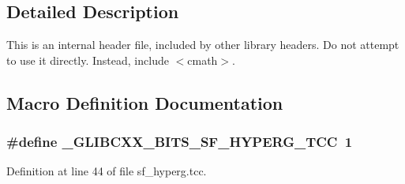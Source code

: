 \subsection{Detailed Description}
This is an internal header file, included by other library headers. Do not attempt to use it directly. Instead, include $<$cmath$>$. 

\subsection{Macro Definition Documentation}
\subsubsection[{\texorpdfstring{\+\_\+\+G\+L\+I\+B\+C\+X\+X\+\_\+\+B\+I\+T\+S\+\_\+\+S\+F\+\_\+\+H\+Y\+P\+E\+R\+G\+\_\+\+T\+CC}{_GLIBCXX_BITS_SF_HYPERG_TCC}}]{\setlength{\rightskip}{0pt plus 5cm}\#define \+\_\+\+G\+L\+I\+B\+C\+X\+X\+\_\+\+B\+I\+T\+S\+\_\+\+S\+F\+\_\+\+H\+Y\+P\+E\+R\+G\+\_\+\+T\+CC~1}\hypertarget{sf__hyperg_8tcc_a44f11aa09d05c90efbd3f7e1184f3a92}{}\label{sf__hyperg_8tcc_a44f11aa09d05c90efbd3f7e1184f3a92}


Definition at line 44 of file sf\+\_\+hyperg.\+tcc.

